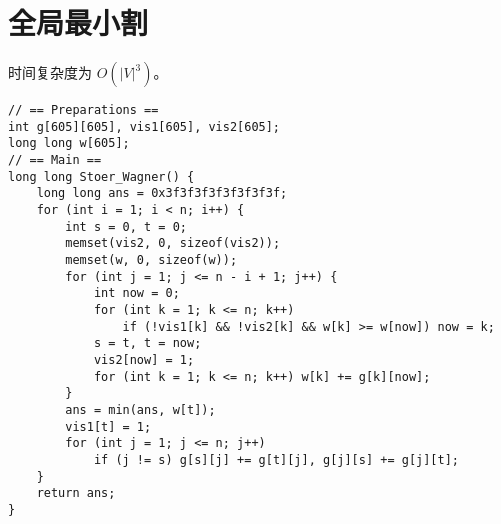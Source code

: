 \section{全局最小割}

时间复杂度为 $O(|V|^3)$。

\begin{verbatim}
// == Preparations ==
int g[605][605], vis1[605], vis2[605];
long long w[605];
// == Main ==
long long Stoer_Wagner() {
    long long ans = 0x3f3f3f3f3f3f3f3f;
    for (int i = 1; i < n; i++) {
        int s = 0, t = 0;
        memset(vis2, 0, sizeof(vis2));
        memset(w, 0, sizeof(w));
        for (int j = 1; j <= n - i + 1; j++) {
            int now = 0;
            for (int k = 1; k <= n; k++)
                if (!vis1[k] && !vis2[k] && w[k] >= w[now]) now = k;
            s = t, t = now;
            vis2[now] = 1;
            for (int k = 1; k <= n; k++) w[k] += g[k][now];
        }
        ans = min(ans, w[t]);
        vis1[t] = 1;
        for (int j = 1; j <= n; j++)
            if (j != s) g[s][j] += g[t][j], g[j][s] += g[j][t];
    }
    return ans;
}
\end{verbatim}